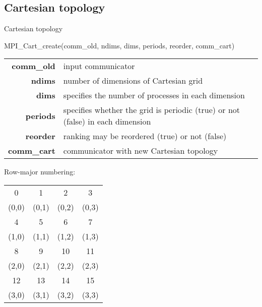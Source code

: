 \documentclass[aspectratio=43]{beamer}
\begin{document}
\subsection{Cartesian topology}
\begin{frame}[fragile]{Cartesian topology}
\begin{Pseudolisting}[]{}
MPI_Cart_create(comm_old, ndims, dims, periods, reorder, 
                comm_cart)
\end{Pseudolisting}
\begin{black1block}{}
\begin{tabular}{rp{8cm}}
\textbf{comm\_old} & input communicator\\
\textbf{ndims} & number of dimensions of Cartesian grid\\
\textbf{dims} & specifies the number of processes in each dimension\\
\textbf{periods} & specifies whether the grid is periodic (true) or not (false) in each dimension\\
\textbf{reorder} & ranking may be reordered (true) or not (false)\\
\textbf{comm\_cart} & communicator with new Cartesian topology\\
\end{tabular}
\end{black1block}
\vspace{-0.3cm}
\begin{center}
Row-major numbering:\hspace{0.5cm}
\footnotesize
\begin{tabular}{|c|c|c|c|}
\hline
\color{cscsblue}0  & \color{cscsblue}1  & \color{cscsblue}2  & \color{cscsblue}3\\
    (0,0) & (0,1) & (0,2) & (0,3)\\\hline
\color{cscsblue}4  & \color{cscsblue}5  & \color{cscsblue}6  & \color{cscsblue}7\\
    (1,0) & (1,1) & (1,2) & (1,3)\\\hline
\color{cscsblue}8  & \color{cscsblue}9  & \color{cscsblue}10 & \color{cscsblue}11\\
    (2,0) & (2,1) & (2,2) & (2,3)\\\hline
\color{cscsblue}12 & \color{cscsblue}13 & \color{cscsblue}14 & \color{cscsblue}15\\
    (3,0) & (3,1) & (3,2) & (3,3)\\\hline
\end{tabular}
\end{center}
\end{frame}
\end{document}
